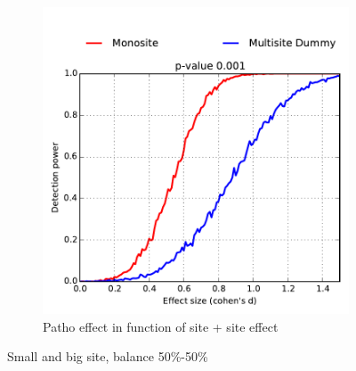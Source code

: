 \documentclass[authoryear]{elsarticle}
\begin{document}
\begin{figure}
\begin{subfigure}[b]{0.475\textwidth}
            \includegraphics[width=\textwidth]{../figures/detect_pow_2080bal5050_var2_site05.pdf}
            {{\tiny Patho effect in function of site + site effect}}    
            \label{fig:2080 bal5050 var2 site05}
        \end{subfigure}
        \caption[]
        {\small Small and big site, balance 50\%-50\%} 
        \label{fig:mean and std of nets}
    \end{figure}
\end{document}
